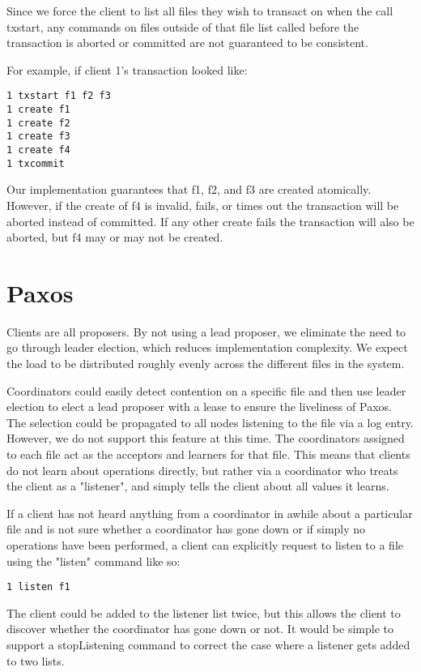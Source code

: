 \documentclass[11pt]{article}
\begin{document}
Since we force the client to list all files they wish to transact on when the call txstart, any commands on files outside of that file list called before the transaction is aborted or committed are not guaranteed to be consistent.

For example, if client 1's transaction looked like:

\begin{verbatim}
1 txstart f1 f2 f3
1 create f1
1 create f2
1 create f3
1 create f4
1 txcommit
\end{verbatim}

Our implementation guarantees that f1, f2, and f3 are created atomically.
However, if the create of f4 is invalid, fails, or times out the transaction will be aborted instead of committed.
If any other create fails the transaction will also be aborted, but f4 may or may not be created.

\section{Paxos}

Clients are all proposers. By not using a lead proposer, we eliminate the need to go through leader election, which reduces implementation complexity. We expect the load to be distributed roughly evenly across the different files in the system.

Coordinators could easily detect contention on a specific file and then use leader election to elect a lead proposer with a lease to ensure the liveliness of Paxos.
The selection could be propagated to all nodes listening to the file via a log entry.
However, we do not support this feature at this time.
The coordinators assigned to each file act as the acceptors and learners for that file. This means that clients do not learn about operations directly, but rather via a coordinator who treats the client as a "listener", and simply tells the client about all values it learns.

If a client has not heard anything from a coordinator in awhile about a particular file and is not sure whether a coordinator has gone down or if simply no operations have been performed, a client can explicitly request to listen to a file using the "listen" command like so:

\begin{verbatim}
1 listen f1
\end{verbatim}

The client could be added to the listener list twice, but this allows the client to discover whether the coordinator has gone down or not.
It would be simple to support a stopListening command to correct the case where a listener gets added to two lists.
\end{document}
